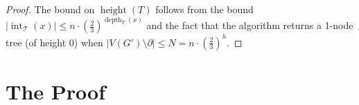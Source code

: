 \documentclass{patmorin}
\newcommand{\pat}[1]{\textcolor{Blue}{[Pat: #1]}}
\DeclareMathOperator{\sep}{sn}
\DeclareMathOperator{\tw}{tw}
\DeclareMathOperator{\depth}{depth}
\DeclareMathOperator{\height}{height}
\DeclareMathOperator{\interior}{int}
\newcommand{\hussein}[1]{\textcolor{purple}{HH: #1}}
\begin{document}
\begin{proof}
  The bound on $\height(T)$ follows from the bound $|\interior_{\mathcal{T}}(x)|\le n\cdot (\tfrac{2}{3})^{\depth_T(x)}$ and the fact that the algorithm returns a 1-node tree (of height $0$) when $|V(G')\setminus\partial|\le N=n\cdot(\tfrac{2}{3})^h$.
\end{proof}










\section{The Proof}

\end{document}
